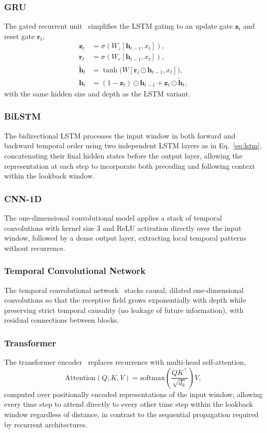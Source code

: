 \subsubsection{GRU}
The gated recurrent unit~\cite{cho2014gru} simplifies the LSTM gating to an update gate $\mathbf{z}_t$ and reset gate $\mathbf{r}_t$,
\begin{align}
\mathbf{z}_t &= \sigma(W_z[\mathbf{h}_{t-1},x_t]), \\
\mathbf{r}_t &= \sigma(W_r[\mathbf{h}_{t-1},x_t]), \\
\tilde{\mathbf{h}}_t &= \tanh\!\big(W[\mathbf{r}_t \odot \mathbf{h}_{t-1}, x_t]\big), \\
\mathbf{h}_t &= (1-\mathbf{z}_t)\odot\mathbf{h}_{t-1} + \mathbf{z}_t \odot \tilde{\mathbf{h}}_t, \label{eq:gru}
\end{align}
with the same hidden size and depth as the LSTM variant.

\subsubsection{BiLSTM}
The bidirectional LSTM processes the input window in both forward and backward temporal order using two independent LSTM layers as in Eq.~\eqref{eq:lstm}, concatenating their final hidden states before the output layer, allowing the representation at each step to incorporate both preceding and following context within the lookback window.

\subsubsection{CNN-1D}
The one-dimensional convolutional model applies a stack of temporal convolutions with kernel size 3 and ReLU activation directly over the input window, followed by a dense output layer, extracting local temporal patterns without recurrence.

\subsubsection{Temporal Convolutional Network}
The temporal convolutional network~\cite{bai2018tcn} stacks causal, dilated one-dimensional convolutions so that the receptive field grows exponentially with depth while preserving strict temporal causality (no leakage of future information), with residual connections between blocks.

\subsubsection{Transformer}
The transformer encoder~\cite{vaswani2017attention} replaces recurrence with multi-head self-attention,
\begin{equation}
\label{eq:attention}
\text{Attention}(Q,K,V) = \text{softmax}\!\left(\frac{QK^\top}{\sqrt{d_k}}\right)V,
\end{equation}
computed over positionally encoded representations of the input window, allowing every time step to attend directly to every other time step within the lookback window regardless of distance, in contrast to the sequential propagation required by recurrent architectures.

